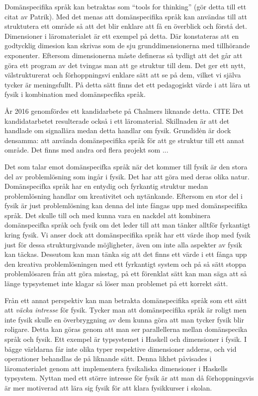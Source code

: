 \begin{binge}
Domänspecifika språk kan betraktas som ``tools for thinking'' (gör detta till ett citat av Patrik). Med det menas att domänspecifika språk kan användas till att struktutera ett område så att det blir enklare att få en överblick och förstå det. Dimensioner i läromaterialet är ett exempel på detta. Där konstateras att en godtycklig dimesion kan skrivas som de sju grunddimensionerna med tillhörande exponenter. Eftersom dimensionerna måste defineras så tydligt att det går att göra ett program av det tvingas man att ge struktur till dem. Det ger ett nytt, välstrukturerat och förhoppningsvi enklare sätt att se på dem, vilket vi själva tycker är meningsfullt. På detta sätt finns det ett pedagogiskt värde i att lära ut fysik i kombination med domänspecfika språk.

År 2016 genomfördes ett kandidarbete på Chalmers liknande detta. CITE Det kandidatarbetet resulterade också i ett läromaterial. Skillnaden är att det handlade om signallära medan detta handlar om fysik. Grundidėn är dock densamma: att använda domänspecifika språk för att ge struktur till ett annat område. Det finns med andra ord flera projekt som ...



Det som talar emot domänspecifka språk när det kommer till fysik är den stora del av problemlösning som ingår i fysik. Det har att göra med deras olika natur. Domänspecifka språk har en entydig och fyrkantig struktur medan problemlösning handlar om kreativitet och nytänkande. Eftersom en stor del i fysik är just problemlösning kan denna del inte fångas upp med domänspecifika språk. Det skulle till och med kunna vara en nackdel att kombinera domänspecifka språk och fysik om det leder till att man tänker alltför fyrkantigt kring fysik. Vi anser dock att domänspecifika språk har ett värde ihop med fysik just för dessa strukturgivande möjligheter, även om inte alla aspekter av fysik kan täckas. Dessutom kan man tänka sig att det finns ett värde i ett fånga upp den kreativa problemlösningen med ett fyrkantigt system och på så sätt stoppa problemlösaren från att göra misstag, på ett förenklat sätt kan man säga att så länge typsystemet inte klagar så löser man problemet på ett korrekt sätt.

Från ett annat perspektiv kan man betrakta domänspecifika språk som ett sätt att \textit{väcka intresse} för fysik. Tycker man att domänspecifika språk är roligt men inte fysik skulle en överbryggning av dem kunna göra att man tycker fysik blir roligare. Detta kan göras genom att man ser parallellerna mellan domänspecika språk och fysik. Ett exempel är typsystemet i Haskell och dimensioner i fysik. I bägge världarna får inte olika typer respektive dimensioner adderas, och vid operationer behandlas de på liknande sätt. Denna likhet påvisades i läromaterialet genom att implementera fysikaliska dimensioner i Haskells typsystem. Nyttan med ett större intresse för fysik är att man då förhoppningsvis är mer motiverad att lära sig fysik för att klara fysikkurser i skolan.


\end{binge}
